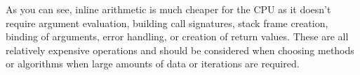 \documentclass[../main.tex]{subfiles}
\begin{document}
    As you can see, inline arithmetic is much cheaper for the CPU as it doesn't require argument evaluation,
    building call signatures, stack frame creation, binding of arguments, error handling, or creation of return values.
    These are all relatively expensive operations and should be considered when choosing methods or algorithms when large amounts
    of data or iterations are required.
\end{document}
